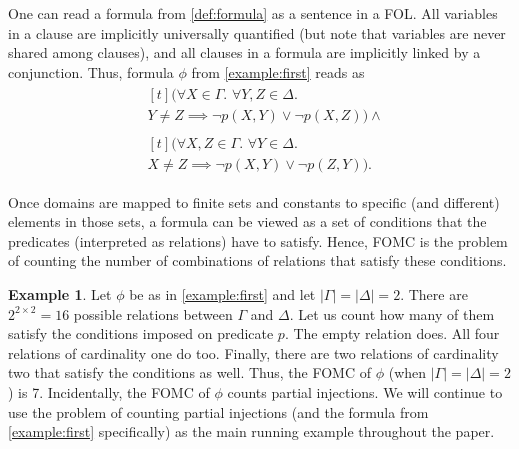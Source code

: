 \documentclass{article}
\theoremstyle{definition}
\newtheorem{example}{Example}
\begin{document}
One can read a formula from \cref{def:formula} as a sentence in a FOL\@. All
variables in a clause are implicitly universally quantified (but note that
variables are never shared among clauses), and all clauses in a formula are
implicitly linked by a conjunction. Thus, formula $\phi$ from
\cref{example:first} reads as
\begin{align*}
  &\begin{multlined}[t]
    (\forall X \in \Gamma\text{. }\forall Y, Z \in \Delta\text{. }\\
    Y \ne Z \implies \neg p(X, Y) \lor \neg p(X, Z)) \land
    \end{multlined}\\
  &\begin{multlined}[t]
    (\forall X, Z \in \Gamma\text{. }\forall Y \in \Delta\text{. }\\
    X \ne Z \implies \neg p(X, Y) \lor \neg p(Z, Y)).
    \end{multlined}
\end{align*}

Once domains are mapped to finite sets and constants to specific (and different)
elements in those sets, a formula can be viewed as a set of conditions that the
predicates (interpreted as relations) have to satisfy. Hence, FOMC is the
problem of counting the number of combinations of relations that satisfy these
conditions.

\begin{example}
  Let $\phi$ be as in \cref{example:first} and let $|\Gamma| = |\Delta| = 2$.
  There are $2^{2 \times 2} = 16$ possible relations between $\Gamma$ and
  $\Delta$. Let us count how many of them satisfy the conditions imposed on
  predicate $p$. The empty relation does. All four relations of cardinality one
  do too. Finally, there are two relations of cardinality two that satisfy the
  conditions as well. Thus, the FOMC of $\phi$ (when $|\Gamma| = |\Delta| = 2$)
  is 7. Incidentally, the FOMC of $\phi$ counts partial injections. We will
  continue to use the problem of counting partial injections (and the formula
  from \cref{example:first} specifically) as the main running example throughout
  the paper.
\end{example}
\end{document}
